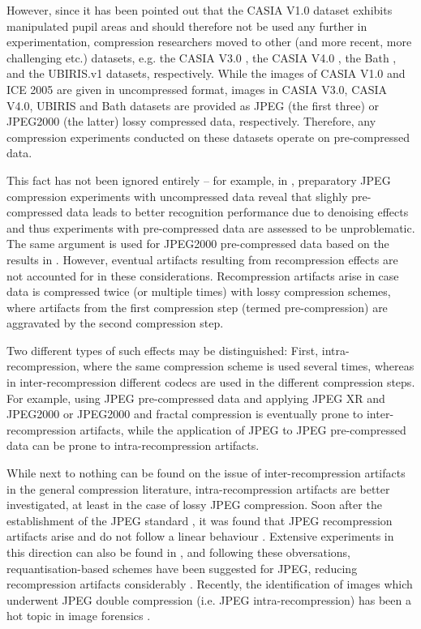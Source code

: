 \documentclass[10pt,twocolumn,letterpaper]{article}
\begin{document}
	However, since it has been pointed out \cite{BPhilips07a} that the CASIA V1.0 dataset exhibits manipulated pupil areas and should therefore not 
	be used any further in experimentation, compression researchers moved to other (and more recent, more challenging etc.) datasets, e.g. 
	the CASIA V3.0 \cite{Horvath11b,Rathgeb12e}, 
	the CASIA V4.0 \cite{BTuba12a}, the Bath \cite{BIves08a,BPardamean12a}, and the UBIRIS.v1 \cite{Haemmerle09a,BCarneiro11a} datasets, respectively.
	While the images of CASIA V1.0 and ICE 2005 are given in uncompressed format, images in CASIA V3.0, CASIA V4.0, UBIRIS and Bath datasets are
	provided as JPEG (the first three) or JPEG2000 (the latter) lossy compressed data, respectively. Therefore, any compression experiments conducted
	on these datasets operate on pre-compressed data. 
	
	This fact has not been ignored entirely -- for example, in \cite{Rathgeb12e}, preparatory JPEG compression experiments with uncompressed data reveal that 
	slighly pre-compressed data leads to better recognition performance due to denoising effects and thus experiments with pre-compressed data are assessed to
	be unproblematic. The same argument is used for JPEG2000 pre-compressed data \cite{BPardamean12a} based on the results in \cite{BIves08a}.
	However, eventual artifacts resulting from recompression effects are not accounted for in these considerations. Recompression artifacts arise in case
	data is compressed twice (or multiple times) with lossy compression schemes, where artifacts from the first compression step (termed pre-compression)
	are aggravated by the second compression step.
	
	Two different types of such effects may be distinguished: First, intra-recompression, where the same compression scheme is used several times, whereas
	in inter-recompression different codecs are used in the different compression steps. For example, using JPEG pre-compressed data and applying
	JPEG XR and JPEG2000 \cite{Horvath11b} or JPEG2000 and fractal compression \cite{BCarneiro11a} is eventually prone to inter-recompression
	artifacts, while the application of JPEG to JPEG pre-compressed data \cite{BTuba12a,Rathgeb12e} can be prone to intra-recompression artifacts.
	
	While next to nothing can be found on the issue of inter-recompression artifacts in the general compression literature, 
	intra-recompression artifacts are better investigated, at least in the case of lossy JPEG compression. Soon after the establishment of
	the JPEG standard \cite{Pennebaker93a}, it was found that JPEG recompression artifacts arise and do not follow a linear behaviour \cite{Chan92a}.
	Extensive experiments in this direction can also  be found in \cite{Kumar11a}, and following these obversations, requantisation-based schemes have been
	suggested for JPEG, reducing recompression artifacts considerably \cite{Bauschke03a}. Recently, the identification of images which underwent 
	JPEG double compression (i.e. JPEG intra-recompression) has been a hot topic in image forensics \cite{Sencar12a}.
	
\end{document}
